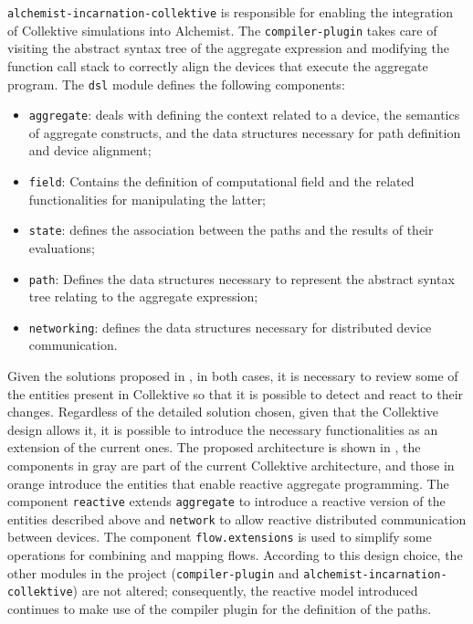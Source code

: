 \texttt{alchemist-incarnation-collektive} is responsible for enabling the integration of Collektive simulations into Alchemist. The \texttt{compiler-plugin} takes care of visiting the abstract syntax tree of the aggregate expression and modifying the function call stack to correctly align the devices that execute the aggregate program. The \texttt{dsl} module defines the following components:
\begin{itemize}
    \item \texttt{aggregate}: deals with defining the context related to a device, the semantics of aggregate constructs, and the data structures necessary for path definition and device alignment;
    \item \texttt{field}: Contains the definition of computational field and the related functionalities for manipulating the latter;
    \item \texttt{state}: defines the association between the paths and the results of their evaluations;
    \item \texttt{path}: Defines the data structures necessary to represent the abstract syntax tree relating to the aggregate expression;
    \item \texttt{networking}: defines the data structures necessary for distributed device communication.
\end{itemize}

Given the solutions proposed in , in both cases, it is necessary to review some of the entities present in Collektive so that it is possible to detect and react to their changes. Regardless of the detailed solution chosen, given that the Collektive design allows it, it is possible to introduce the necessary functionalities as an extension of the current ones. The proposed architecture is shown in , the components in gray are part of the current Collektive architecture, and those in orange introduce the entities that enable reactive aggregate programming. The component \texttt{reactive} extends \texttt{aggregate} to introduce a reactive version of the entities described above and \texttt{network} to allow reactive distributed communication between devices. The component \texttt{flow.extensions} is used to simplify some operations for combining and mapping flows. According to this design choice, the other modules in the project (\texttt{compiler-plugin} and \texttt{alchemist-incarnation-collektive}) are not altered; consequently, the reactive model introduced continues to make use of the compiler plugin for the definition of the paths.

